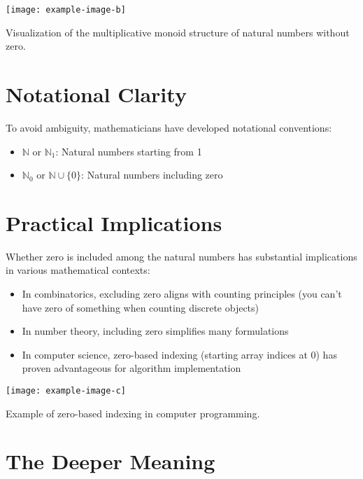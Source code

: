 \documentclass[../../../OAE-SPEC-MAIN.tex]{subfiles}
\begin{document}
\begin{marginfigure}
\texttt{[image: example-image-b]}
\caption{Visualization of the multiplicative monoid structure of natural numbers without zero.}
\end{marginfigure}

\section{Notational Clarity}

To avoid ambiguity, mathematicians have developed notational conventions:
\begin{itemize}
\item $\mathbb{N}$ or $\mathbb{N}_1$: Natural numbers starting from 1
\item $\mathbb{N}_0$ or $\mathbb{N} \cup \{0\}$: Natural numbers including zero
\end{itemize}


\section{Practical Implications}

Whether zero is included among the natural numbers has substantial implications in various mathematical contexts:

\begin{itemize}
\item In combinatorics, excluding zero aligns with counting principles (you can't have zero of something when counting discrete objects)
\item In number theory, including zero simplifies many formulations
\item In computer science, zero-based indexing (starting array indices at 0) has proven advantageous for algorithm implementation
\end{itemize}

\begin{marginfigure}
\texttt{[image: example-image-c]}
\caption{Example of zero-based indexing in computer programming.}
\end{marginfigure}

\section{The Deeper Meaning}
\end{document}
